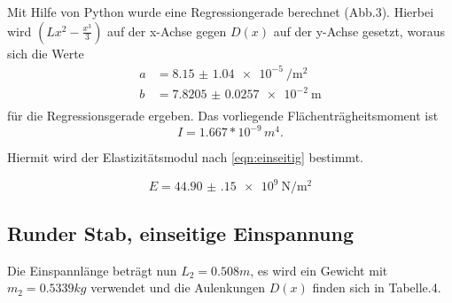 Mit Hilfe von Python wurde eine Regressiongerade berechnet (Abb.3).
Hierbei wird $(Lx^2- \frac{x^3}{3})$ auf der x-Achse gegen $D(x)$ auf der y-Achse
gesetzt, woraus sich die Werte
\begin{align*}
  a &= \SI{8.15(104)e-5}{\per\square\meter} \\
  b &= \SI{7.8205(257)e-2}{\meter} \\
\end{align*}
für die Regressionsgerade ergeben.
\newline
Das vorliegende Flächenträgheitsmoment ist
\begin{equation*}
  I = 1.667* 10^{-9}\, m^4.
\end{equation*}

Hiermit wird der Elastizitätsmodul nach \ref{eqn:einseitig} bestimmt.

\begin{equation*}
  E = \SI{44.90(15)e9}{\newton\per\square\meter}
\end{equation*}
\newpage






\subsection{Runder Stab, einseitige Einspannung}
Die Einspannlänge beträgt nun $L_2 = 0.508m$, es wird ein Gewicht
mit $m_2 = 0.5339 kg $ verwendet und die Aulenkungen $D(x)$ finden
sich in Tabelle.4.

